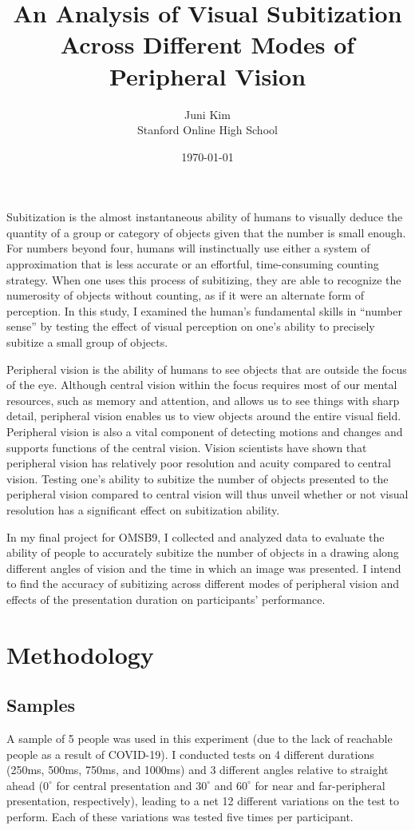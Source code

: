 \documentclass[12pt]{article}
\title{An Analysis of Visual Subitization Across Different Modes of Peripheral
Vision}
\author{Juni Kim \\
Stanford Online High School}
\date{\today}
\begin{document}
 

\maketitle

Subitization is the almost instantaneous ability of humans to visually deduce
the quantity of a group or category of objects given that the number is small
enough. For numbers beyond four, humans will instinctually use either a
system of approximation that is less accurate or an effortful, time-consuming
counting strategy. When one uses this process of subitizing, they are able to
recognize the numerosity of objects without counting, as if it were an
alternate form of perception.  In this study, I examined the human’s
fundamental skills in “number sense” by testing the effect of visual perception
on one’s ability to precisely subitize a small group of objects. 

Peripheral vision is the ability of humans to see objects that are outside the
focus of the eye. Although central vision within the focus requires most of our
mental resources, such as memory and attention, and allows us to see things
with sharp detail, peripheral vision enables us to view objects around the
entire visual field. Peripheral vision is also a vital component of detecting
motions and changes and supports functions of the central vision. Vision
scientists have shown that peripheral vision has relatively poor resolution and
acuity compared to central vision. Testing one’s ability to subitize the number
of objects presented to the peripheral vision compared to central vision will
thus unveil whether or not visual resolution has a significant effect on
subitization ability.

In my final project for OMSB9, I collected and analyzed data to evaluate the
ability of people to accurately subitize the number of objects in a drawing
along different angles of vision and the time in which an image was presented.
I intend to find the accuracy of subitizing across different modes of
peripheral vision and effects of the presentation duration on participants'
performance.

\section{Methodology}

\subsection{Samples}
A sample of 5 people was used in this experiment (due to the lack of reachable
people as a result of COVID-19). I conducted tests on 4 different
durations (250ms, 500ms, 750ms, and 1000ms) and 3 different angles relative to
straight ahead ($0^{\circ}$ for central presentation and $30^{\circ}$ and
$60^{\circ}$ for near and far-peripheral presentation, respectively),
leading to a net 12 different variations on the test to perform. Each
of these variations was tested five times per participant.
\end{document}
